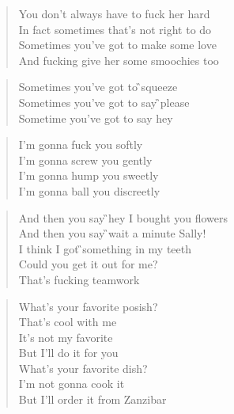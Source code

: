 \documentclass[9pt,a4paper,oneside, onecolumn]{article}
\begin{document}
\begin{multicols}{2}
\raggedcolumns

\begin{verse}
\D{}You don't always \Fism{}have to fuck her hard\\
In \Em{}fact sometimes that's not \A{}right to do\\
Some\D{}times you've got to \Fism{}make some love\\
\Em{}\quad And fucking give her some \A{}smoochies too\\
\end{verse}

\begin{verse}
\Hm{}Sometimes you've got to \G{}squeeze\\
\Hm{}Sometimes you've got to say \G{}please\\
\D{}Sometime you've got to say \A{}hey\\
\end{verse}

\begin{verse}
I'm gonna \D{}fuck you \Fism{}softly\\
I'm gonna \Em{}screw you \A{}gently\\
I'm gonna \D{}hump you \Fism{}sweetly\\
I'm gonna \Em{}ball you \A{}discreetly\\
\end{verse}

\begin{verse}
\Hm{}\quad And then you say \G{}hey I bought you flowers\\
\Hm{}\quad And then you say \G{}wait a minute Sally!\\
\Hm{}\quad I think I got \G{}something in my teeth\\
Could you \Em{}get it out for me?\\
\A{}That's fucking teamwork\\
\end{verse}
\columnbreak
\begin{verse}
\D{}What's your favorite po\Fism{}sish?\\
\Em{}That's cool with me\\
It's not my \A{}favorite\\
But I'll do it for \D{}you\\
What's your favorite \Fism{}dish?\\
I'm not gonna \Em{}cook it\\
But I'll order it from \A{}Zanzibar\\
\end{verse}


\end{multicols}
\end{document}

